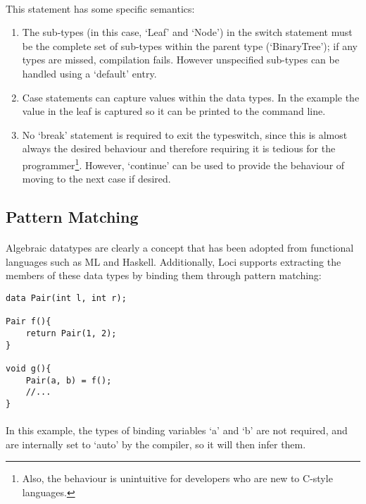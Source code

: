 \documentclass[12pt,twoside,notitlepage]{report}
\begin{document}
\paragraph{}
This statement has some specific semantics:

\begin{enumerate}
\item The sub-types (in this case, `Leaf' and `Node') in the switch statement must be the complete set of sub-types within the parent type (`BinaryTree'); if any types are missed, compilation fails. However unspecified sub-types can be handled using a `default' entry.
\item Case statements can capture values within the data types. In the example the value in the leaf is captured so it can be printed to the command line.
\item No `break' statement is required to exit the typeswitch, since this is almost always the desired behaviour and therefore requiring it is tedious for the programmer\footnote{Also, the behaviour is unintuitive for developers who are new to C-style languages.}. However, `continue' can be used to provide the behaviour of moving to the next case if desired.
\end{enumerate}

\clearpage

\subsection{Pattern Matching}

\paragraph{}
Algebraic datatypes are clearly a concept that has been adopted from functional languages such as ML and Haskell. Additionally, Loci supports extracting the members of these data types by binding them through pattern matching:

\begin{lstlisting}
data Pair(int l, int r);

Pair f(){
	return Pair(1, 2);
}

void g(){
	Pair(a, b) = f();
	//...
}
\end{lstlisting}

\paragraph{}
In this example, the types of binding variables `a' and `b' are not required, and are internally set to `auto' by the compiler, so it will then infer them.
\end{document}
